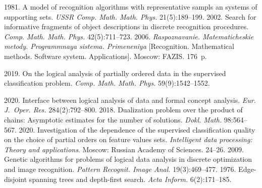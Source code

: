   \begin{multicols}{2}

\renewcommand{\bibname}{\protect\rmfamily References}

{\small\frenchspacing
 {%
 \begin{thebibliography}{9}
 1981. A model of recognition algorithms with 
representative sampls an systems of supporting sets. \textit{USSR Comp. Math. Math. Phys.} 
21(5):189--199.
 2002. Search for informative fragments of object descriptions 
in discrete recognition procedures. \textit{Comp. Math. Math. Phys.} 42(5):711--723.
 2006. \textit{Raspoznavanie. 
Matematicheskie metody. Programmnaya sistema. Primeneniya} [Recognition. Mathematical 
methods. Software system. Applications]. Moscow: FAZIS. 176~p.

 2019. On the logical analysis of partially 
ordered data in the supervised classification problem. \textit{Comp. Math. Math. Phys.} 
59(9):1542--1552.
  
 2020. Interface between 
logical analysis of data and formal concept analysis. \textit{Eur. J.~Oper. Res.} 
284(2):792--800.
 2018. Dualization problem over the product 
of chains: Asymptotic estimates for the number of solutions. \textit{Dokl. Math.} 98:564--567.
 2020. Investigation of the dependence of 
the supervised classification quality on the choice of partial orders on feature values sets. 
\textit{Intelligent data processing: Theory and applications}. Moscow: 
Russian Academy of Sciences. 24--26.
 2009. Genetic algorithms for problems of logical data analysis in discrete 
optimization and image recognition. \textit{Pattern Recognit. Image Anal.} 19(3):469--477.
 1976. Edge-disjoint spanning trees and depth-first search. \textit{Acta 
Inform.} 6(2):171--185.
\end{thebibliography}

 }
 }

\end{multicols}

